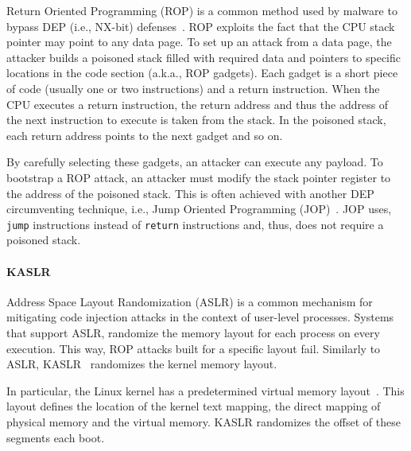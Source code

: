 Return Oriented Programming (ROP) is a common method used by malware to bypass DEP (i.e., NX-bit) defenses~\cite{RBSS12}. ROP exploits the fact that the CPU stack pointer may point to any data page. To set up an attack from a data page, the attacker builds a poisoned stack filled with required data and pointers to specific locations in the code section (a.k.a., ROP gadgets). Each gadget is a short piece of code (usually one or two instructions) and a return instruction. When the CPU executes a return instruction, the return address and thus the address of the next instruction to execute is taken from the stack. In the poisoned stack, each return address points to the next gadget and so on. 
 
By carefully selecting these gadgets, an attacker can execute any payload. To bootstrap a ROP attack, an attacker must modify the stack pointer register to the address of the poisoned stack. This is often achieved with another DEP circumventing technique, i.e., Jump Oriented Programming (JOP)~\cite{BJFL11}. JOP uses, \texttt{jump} instructions instead of \texttt{return} instructions and, thus, does not require a poisoned stack.

\paragraph{KASLR}\label{sec:kaslr}

Address Space Layout Randomization (ASLR) is a common mechanism for mitigating code injection attacks in the context of user-level processes. Systems that support ASLR, randomize the memory layout for each process on every execution. This way, ROP attacks built for a specific layout fail. Similarly to ASLR, KASLR~\cite{kalsr} randomizes the kernel memory layout.

In particular, the Linux kernel has a predetermined virtual memory layout~\cite{mem_layout}. This layout defines the location of the kernel text mapping, the direct mapping of physical memory and the virtual memory. KASLR randomizes the offset of these segments each boot.


